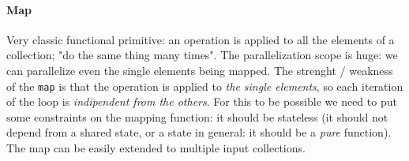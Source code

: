 \documentclass{article}
\begin{document}
				\paragraph{Map}
					Very classic functional primitive: an operation is applied to all the elements of a collection; "do the same thing many times". The parallelization scope is huge: we can parallelize even the single elements being mapped. The strenght / weakness of the \verb|map| is that the operation is applied to \textit{the single elements}, so each iteration of the loop is \textit{indipendent from the others}. For this to be possible we need to put some constraints on the mapping function: it should be stateless (it should not depend from a shared state, or a state in general: it should be a \textit{pure} function). The map can be easily extended to multiple input collections.
\end{document}
